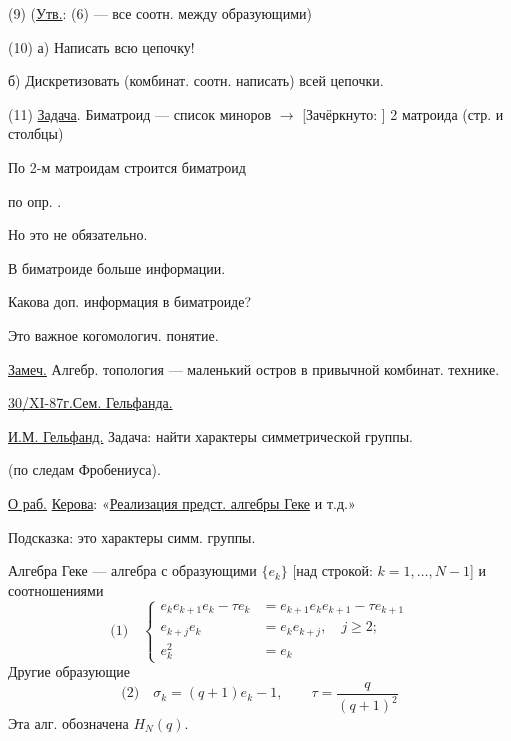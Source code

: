 (9) (\underline{Утв.}: (6) — все соотн. между образующими)

(10) а) Написать всю цепочку!

б) Дискретизовать (комбинат. соотн. написать) всей цепочки.

(11) \underline{Задача}. Биматроид — список миноров $\longrightarrow$
[Зачёркнуто: ]
2 матроида
(стр. и столбцы)

По 2-м матроидам строится биматроид




по опр. .

Но это не обязательно.

В биматроиде больше информации.

Какова доп. информация в биматроиде?

Это важное когомологич. понятие.

\underline{Замеч.} Алгебр. топология — маленький остров в привычной
комбинат. технике.


\underline{\underline{30/XI-87г.}}\qquad \underline{Сем. Гельфанда.}

\underline{И.М. Гельфанд.} Задача: найти характеры симметрической группы.

(по следам Фробениуса).

\underline{О раб.} \underline{Керова}: «\underline{Реализация предст. алгебры Геке} и т.д.»

Подсказка: это характеры симм. группы.

Алгебра Геке --- алгебра с образующими $\{e_k\}$
[над строкой: $k=1,\ldots,N-1$] и соотношениями
\begin{equation*}
\text{(1)}\quad
\left\{\begin{aligned}
e_k e_{k+1}e_k-\tau e_k&=e_{k+1}e_k e_{k+1}-\tau e_{k+1}\\
e_{k+j}e_k&=e_k e_{k+j},\quad j\geq 2;\\
e_k^2&=e_k
\end{aligned}\right.
\end{equation*}
Другие образующие
\begin{equation*}
\text{(2)}\quad \sigma_k=(q+1)e_k-1,\qquad \tau=\frac{q}{(q+1)^2}
\end{equation*}
Эта алг. обозначена $H_N(q)$.

